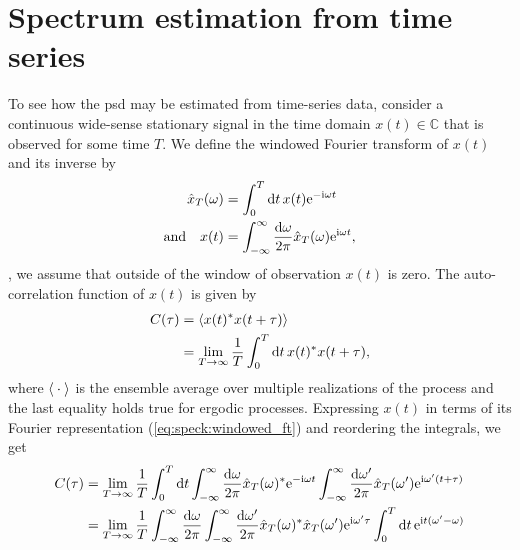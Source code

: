 \section{Spectrum estimation from time series}\label{sec:speck:theory:time_series_estimation}
To see how the \gls{psd} may be estimated from time-series data, consider a continuous wide-sense stationary
signal in the time domain $x(t)\in\mathbb{C}$ that is observed for some time $T$.
We define the windowed Fourier transform of $x(t)$ and its inverse by
\begin{align}
    \hat{x}_T(\omega) &= \int_{0}^{T}\dd{t} x(t)\e^{-\i\omega t} \label{eq:speck:windowed_ft}\\
       \qq*{and} x(t) &= \intinf\ddf{\omega}\hat{x}_T(\omega)\e^{\i\omega t}, \label{eq:speck:windowed_ft:inverse}
\end{align}
\ie, we assume that outside of the window of observation $x(t)$ is zero.
The auto-correlation function of $x(t)$ is given by
\begin{align}
    C(\tau) &= \expval{x(t)^\ast x(t + \tau)} \label{eq:speck:autocorrelation}\\
            &= \lim_{T\to\infty} \frac{1}{T}\int_0^T\dd{t} x(t)^{\ast} x(t + \tau),
\end{align}
where $\expval{\:\cdot\:}$ is the ensemble average over multiple realizations of the process and the last equality holds true for ergodic processes.
Expressing $x(t)$ in terms of its Fourier representation (\cref{eq:speck:windowed_ft}) and reordering the integrals, we get
\begin{align}
    C(\tau) &= \lim_{T\to\infty}\frac{1}{T}\int_0^T\dd{t}
                \int_{-\infty}^{\infty}\frac{\dd{\omega}}{2\pi}\hat{x}_T(\omega)^{\ast}\mathrm{e}^{-\mathrm{i}\omega t}
                \int_{-\infty}^{\infty}\frac{\dd{\omega^\prime}}{2\pi}\hat{x}_T(\omega^\prime)\mathrm{e}^{\mathrm{i}\omega^\prime (t + \tau)}  \\
            &= \lim_{T\to\infty}\frac{1}{T}\int_{-\infty}^{\infty}\frac{\dd{\omega}}{2\pi}\int_{-\infty}^{\infty}\frac{\dd{\omega^\prime}}{2\pi}
                \hat{x}_T(\omega)^{\ast}\hat{x}_T(\omega^\prime)\mathrm{e}^{\mathrm{i}\omega^\prime\tau}
                \int_0^T\dd{t}\mathrm{e}^{\mathrm{i} t (\omega^\prime - \omega)} \label{eq:speck:autocorrelation:fourier}
\end{align}
